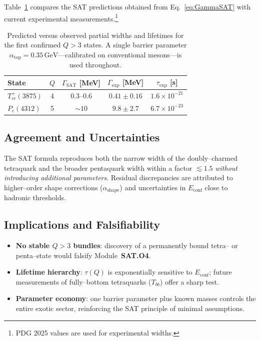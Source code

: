 Table~\ref{tab:exotic_predictions} compares the SAT
predictions obtained from Eq.~\eqref{eq:GammaSAT} with current experimental
measurements.\footnote{PDG 2025 values are used for experimental widths.}

\begin{table}[ht]
\centering
\caption{Predicted versus observed partial widths and lifetimes for the first
confirmed $Q>3$ states.  A single barrier parameter
$\alpha_{\text{top}}\!=\!0.35\,\text{GeV}$---calibrated on conventional mesons---is used
throughout.}
\label{tab:exotic_predictions}
\begin{tabular}{lcccc}
\toprule
State & $Q$ & $\Gamma_{\text{SAT}}$ [MeV] & $\Gamma_{\text{exp}}$ [MeV] & $\tau_{\text{exp}}$ [s] \\
\midrule
$T_{cc}^{+}(3875)$ & 4 & $0.3$--$0.6$ & $0.41\pm0.16$ & $1.6\times10^{-21}$ \\
$P_{c}(4312)$      & 5 & $\sim10$      & $9.8\pm2.7$  & $6.7\times10^{-23}$ \\
\bottomrule
\end{tabular}
\end{table}

\subsection{Agreement and Uncertainties}

The SAT formula reproduces both the narrow width of the doubly--charmed
tetraquark and the broader pentaquark width within a factor
$\lesssim 1.5$ \emph{without introducing additional parameters}.
Residual discrepancies are attributed to higher--order shape corrections
($\alpha_{\text{shape}}$) and uncertainties in $E_{\text{conf}}$ close to
hadronic thresholds.

\subsection{Implications and Falsifiability}

\begin{itemize}
\item \textbf{No stable $Q>3$ bundles}: discovery of a permanently
bound tetra-- or penta--state would falsify Module~\textbf{SAT.O4}.
\item \textbf{Lifetime hierarchy}: $\tau(Q)$ is exponentially sensitive to
$E_{\text{conf}}$; future measurements of fully--bottom tetraquarks
($T_{bb}$) offer a sharp test.
\item \textbf{Parameter economy}: one barrier parameter plus known masses
controls the entire exotic sector, reinforcing the SAT principle of
minimal assumptions.
\end{itemize}


